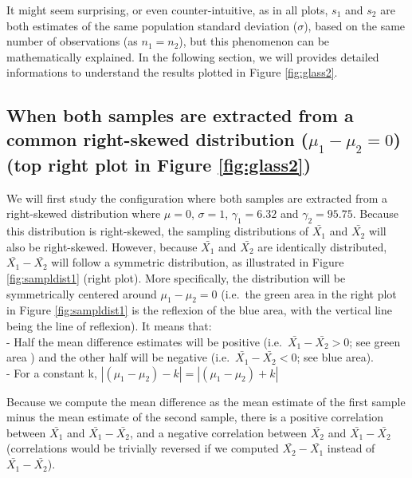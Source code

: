 \documentclass[
  man,floatsintext]{apa6}
\begin{document}
It might seem surprising, or even counter-intuitive, as in all plots, \(s_1\) and \(s_2\) are both estimates of the same population standard deviation (\(\sigma\)), based on the same number of observations (as \(n_1=n_2\)), but this phenomenon can be mathematically explained. In the following section, we will provides detailed informations to understand the results plotted in Figure \ref{fig:glass2}.

\hypertarget{when-both-samples-are-extracted-from-a-common-right-skewed-distribution-mu_1-mu_20-top-right-plot-in-figure}{%
\subsection{\texorpdfstring{When both samples are extracted from a common right-skewed distribution (\textbf{\(\mu_1-\mu_2=0\)}) (top right plot in Figure \ref{fig:glass2})}{When both samples are extracted from a common right-skewed distribution (\textbackslash mu\_1-\textbackslash mu\_2=0) (top right plot in Figure )}}\label{when-both-samples-are-extracted-from-a-common-right-skewed-distribution-mu_1-mu_20-top-right-plot-in-figure}}

We will first study the configuration where both samples are extracted from a right-skewed distribution where \(\mu=0\), \(\sigma=1\), \(\gamma_1=6.32\) and \(\gamma_2=95.75\). Because this distribution is right-skewed, the sampling distributions of \(\bar{X_1}\) and \(\bar{X_2}\) will also be right-skewed. However, because \(\bar{X_1}\) and \(\bar{X_2}\) are identically distributed, \(\bar{X_1}-\bar{X_2}\) will follow a symmetric distribution, as illustrated in Figure \ref{fig:sampldist1} (right plot).
More specifically, the distribution will be symmetrically centered around \(\mu_1-\mu_2=0\) (i.e.~the green area in the right plot in Figure \ref{fig:sampldist1} is the reflexion of the blue area, with the vertical line being the line of reflexion). It means that:\\
- Half the mean difference estimates will be positive (i.e.~\(\bar{X_1}-\bar{X_2} > 0\); see green area ) and the other half will be negative (i.e.~\(\bar{X_1}-\bar{X_2} < 0\); see blue area).\\
- For a constant k, \(|(\mu_1-\mu_2)-k|=|(\mu_1-\mu_2)+k|\)

Because we compute the mean difference as the mean estimate of the first sample minus the mean estimate of the second sample, there is a positive correlation between \(\bar{X_1}\) and \(\bar{X_1}-\bar{X_2}\), and a negative correlation between \(\bar{X_2}\) and \(\bar{X_1}-\bar{X_2}\) (correlations would be trivially reversed if we computed \(\bar{X_2}-\bar{X_1}\) instead of \(\bar{X_1}-\bar{X_2}\)).
\end{document}
